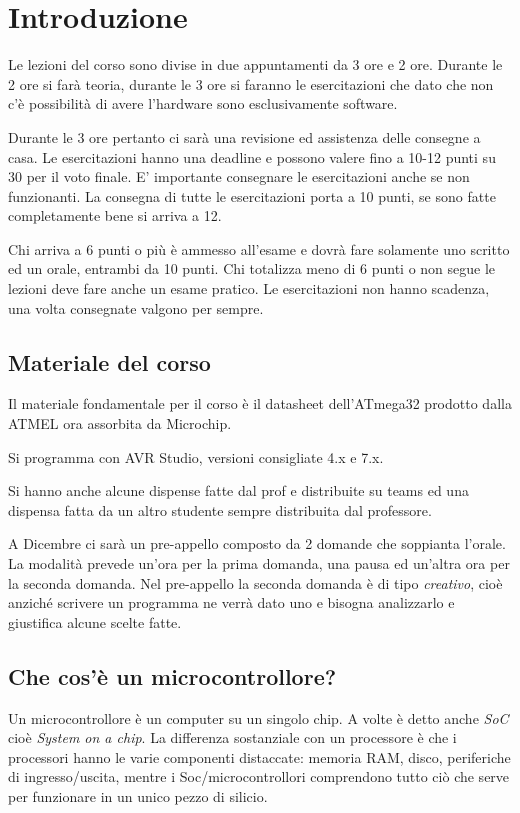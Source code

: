 \section{Introduzione}

Le lezioni del corso sono divise in due appuntamenti da 3 ore e 2 ore.
Durante le 2 ore si farà teoria, durante le 3 ore si faranno le esercitazioni che dato che non c'è possibilità di avere l'hardware sono esclusivamente software.

Durante le 3 ore pertanto ci sarà una revisione ed assistenza delle consegne a casa. Le esercitazioni hanno una deadline e possono valere fino a 10-12 punti su 30 per il voto finale.
E' importante consegnare le esercitazioni anche se non funzionanti. La consegna di tutte le esercitazioni porta a 10 punti, se sono fatte completamente bene si arriva a 12.

Chi arriva a 6 punti o più è ammesso all'esame e dovrà fare solamente uno scritto ed un orale, entrambi da 10 punti. Chi totalizza meno di 6 punti o non segue le lezioni deve fare anche un esame pratico. Le esercitazioni non hanno scadenza, una volta consegnate valgono per sempre.

\subsection{Materiale del corso}
Il materiale fondamentale per il corso è il datasheet dell'ATmega32 prodotto dalla ATMEL ora assorbita da Microchip.

Si programma con AVR Studio, versioni consigliate 4.x e 7.x.

Si hanno anche alcune dispense fatte dal prof e distribuite su teams ed una dispensa fatta da un altro studente sempre distribuita dal professore.

A Dicembre ci sarà un pre-appello composto da 2 domande che soppianta l'orale. La modalità prevede un'ora per la prima domanda, una pausa ed un'altra ora per la seconda domanda. Nel pre-appello la seconda domanda è di tipo \emph{creativo}, cioè anziché scrivere un programma ne verrà dato uno e bisogna analizzarlo e giustifica alcune scelte fatte.

\subsection{Che cos'è un microcontrollore?}
Un microcontrollore è un computer su un singolo chip. A volte è detto anche \emph{SoC} cioè \emph{System on a chip}. La differenza sostanziale con un processore è che i processori hanno le varie componenti distaccate: memoria RAM, disco, periferiche di ingresso/uscita, mentre i Soc/microcontrollori comprendono tutto ciò che serve per funzionare in un unico pezzo di silicio.

